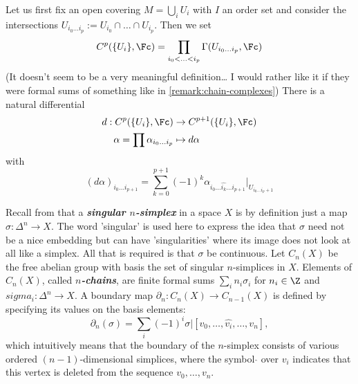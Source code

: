 Let us first fix an open covering $M=\bigcup_iU_i$ with $I$ an order set and consider the intersections $U_{i_0\ldots i_p}:=U_{i_0}\cap\ldots\cap U_{i_p}$. Then we set
\[C^p(\{U_i\},\Fc)=\prod_{i_0<\ldots<i_p}\Gamma(U_{i_0\ldots i_p},\Fc)\]
{\color{cyan}(It doesn't seem to be a very meaningful definition… I would rather like it if they were formal sums of something like in \cref{remark:chain-complexes})} There is a natural differential
\begin{align*}
	d:C^p(\{U_i\},\Fc)&\to C^{p+1}(\{U_i\},\Fc)\\
	\alpha=\prod\alpha_{i_0\ldots i_p}&\mapsto d\alpha
\end{align*}
with
\[(d\alpha)_{i_0\ldots i_{p+1}}=\sum_{k=0}^{p+1}(-1)^k\alpha_{i_0\ldots\widehat{i_k}\ldots i_{p+1}}|_{U_{i_0\ldots i_p+1}}\]
\begin{remark}\label{remark:chain-complexes}
	Recall from \cite{hatcher-at} that a \textbf{\textit{singular $n$-simplex}} in a space $X$ is by definition just a map $\sigma:\Delta^n\to X$. The word 'singular' is used here to express the idea that $\sigma$ need not be a nice embedding but can have 'singularities' where its image does not look at all like a simplex. All that is required is that $\sigma$ be continuous. Let $C_n(X)$ be the free abelian group with basis the set of singular $n$-simplices in $X$. Elements of $C_n(X)$, called \textbf{\textit{$n$-chains}}, are finite formal sums $\sum_in_i\sigma_i$ for $n_i\in\Z$ and $sigma_i:\Delta^n\to X$. A boundary map $\partial_n:C_n(X)\to C_{n-1}(X)$ is defined by specifying its values on the basis elements:
	\[\partial_n(\sigma)=\sum_i(-1)^i\sigma|[v_0,\ldots,\widehat{v_i},\ldots,v_n],\]
	which intuitively means that the boundary of the $n$-simplex consists of various ordered $(n-1)$-dimensional simplices, where the symbol $\hat{}$ over $v_i$ indicates that this vertex is deleted from the sequence $v_0,\ldots,v_n$.
	

\end{remark}
